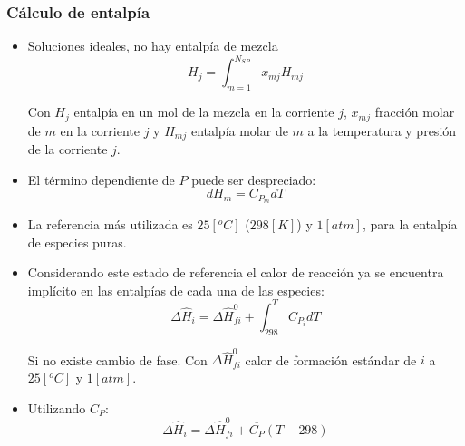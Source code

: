         \subsubsection{Cálculo de entalpía}
        
            
            \begin{itemize}
                \item Soluciones ideales, no hay entalpía de mezcla
                \[H_{j} = \int_{m=1}^{N_{SP}} x_{mj}H_{mj}\]
                
                Con \(H_{j}\) entalpía en un mol de la mezcla en la corriente \(j\), \(x_{mj}\) fracción molar de \(m\) en la corriente \(j\) y \(H_{mj}\) entalpía molar de \(m\) a la temperatura y presión de la corriente \(j\).
                
                \item El término dependiente de \(P\) puede ser despreciado:
                \[dH_{m} = C_{P_{m}}dT\]
            \end{itemize}
            
            
            \begin{itemize}
                \item La referencia más utilizada es \(25 [{}^{o}C]\) (\(298 [K]\)) y \(1 [atm]\), para la entalpía de especies puras.
                
                \item Considerando este estado de referencia el calor de reacción ya se encuentra implícito en las entalpías de cada una de las especies:
                \[\Delta \widehat{H}_{i} = \Delta \widehat{H}_{fi}^{0} + \int_{298}^{T}C_{P_{i}}dT\]
                
                Si no existe cambio de fase. Con \(\Delta \widehat{H}_{fi}^{0}\) calor de formación estándar de \(i\) a \(25 [{}^{o}C]\) y \(1 [atm]\).
                
                \item Utilizando \(\overline{C_{P}}\):
                \[\Delta \widehat{H}_{i} = \Delta \widehat{H}_{fi}^{0} + \overline{C_{P}} \left ( T - 298 \right )\]
            \end{itemize}
            
